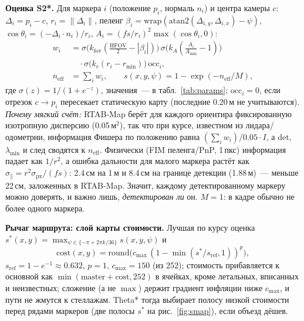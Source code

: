 \documentclass[10pt,twocolumn]{article}
\begin{document}
\textbf{Оценка S2*.} Для маркера $i$ (положение $p_i$, нормаль $n_i$) и центра камеры $c$: $\Delta_i=p_i-c$, $r_i=\|\Delta_i\|$, пеленг $\beta_i=\mathrm{wrap}(\mathrm{atan2}(\Delta_{i,y},\Delta_{i,x})-\psi)$, $\cos\theta_i=(-\Delta_i\cdot n_i)/r_i$, $A_i=(f s/r_i)^2\max(\cos\theta_i,0)$:
\begin{align}
w_i&=\sigma\!\big(k_{\mathrm{fov}}(\tfrac{\mathrm{HFOV}}{2}-|\beta_i|)\big)\,
    \sigma\!\big(k_A(\tfrac{A_i}{A_{\min}}-1)\big)\nonumber\\
   &\quad\cdot\sigma\!\big(k_r(r_i-r_{\min})\big)\,\mathrm{occ}_i,\nonumber\\
n_{\mathrm{eff}}&=\textstyle\sum_i w_i,\qquad s(x,y,\psi)=1-\exp(-n_{\mathrm{eff}}/M),
\end{align}
где $\sigma(z)=1/(1+e^{-z})$, значения~--- в табл.~\ref{tab:params}; $\mathrm{occ}_i=0$, если отрезок $c\to p_i$ пересекает статическую карту (последние 0.20\,м не учитываются).
\emph{Почему мягкий счёт:} RTAB-Map берёт для каждого ориентира фиксированную изотропную дисперсию (0.05\,м$^2$), так что при курсе, известном из лидара/одометрии, информация Фишера по положению равна $(\sum_i w_i)/0.05\cdot I$, а det, $\lambda_{\min}$ и след сводятся к $n_{\mathrm{eff}}$. Физически (FIM пеленга/PnP, 1\,пкс) информация падает как $1/r^2$, а ошибка дальности для малого маркера растёт как $\sigma_\parallel=r^2\sigma_{\mathrm{px}}/(fs)$: 2.4\,см на 1\,м и 8.4\,см на границе детекции (1.88\,м)~--- меньше 22\,см, заложенных в RTAB-Map. Значит, каждому детектированному маркеру можно доверять, и важно лишь, \emph{детектирован ли} он.
$M=1$: в кадре обычно не более одного маркера.

\textbf{Рычаг маршрута: слой карты стоимости.} Лучшая по курсу оценка $s^*(x,y)=\max_{\psi\in\{-\pi+2\pi k/36\}}s(x,y,\psi)$ и
\begin{equation}
\mathrm{cost}(x,y)=\mathrm{round}\big(c_{\max}\,(1-\min(s^*/s_{\mathrm{ref}},1))^p\big),
\end{equation}
$s_{\mathrm{ref}}=1-e^{-1}\approx0.632$, $p=1$, $c_{\max}=150$ (из 252); стоимость прибавляется к основной как $\min(\text{master}+\text{cost},252)$ в ячейках, кроме летальных, вписанных и неизвестных; сложение (а не $\max$) держит градиент инфляции ниже $c_{\max}$, и пути не жмутся к стеллажам. Theta* тогда выбирает полосу низкой стоимости перед рядами маркеров (две полосы $s^*$ на рис.~\ref{fig:smap}), если объезд дёшев.
\end{document}

